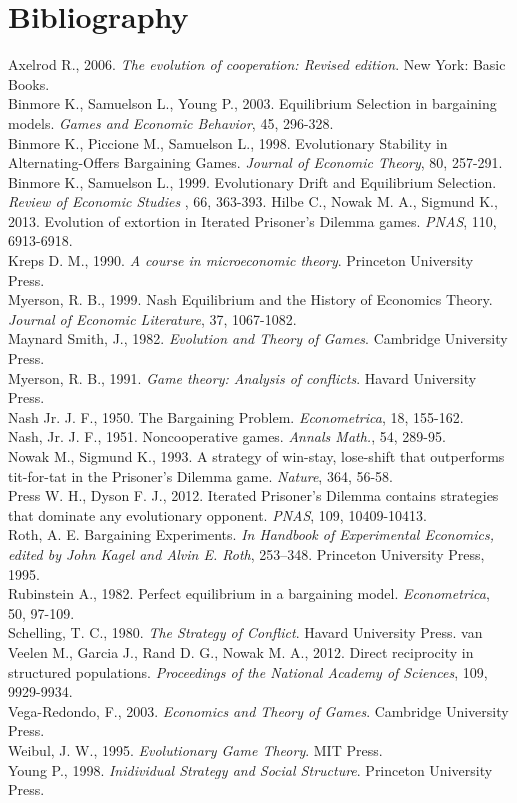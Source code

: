 \documentclass[12.5pt]{report}
\begin{document}
\chapter*{Bibliography}
Axelrod R., 2006. {\emph{The evolution of cooperation: Revised edition}}. New York: Basic Books.\\ 
Binmore K., Samuelson L., Young P., 2003. Equilibrium Selection in bargaining models. {\emph{Games and Economic Behavior}}, 45, 296-328.\\ 
Binmore K., Piccione M., Samuelson L., 1998. Evolutionary Stability in Alternating-Offers Bargaining Games. {\emph{Journal of Economic Theory}}, 80, 257-291.  \\
Binmore K., Samuelson L., 1999. Evolutionary Drift and Equilibrium Selection. {\emph{Review of Economic Studies }}, 66, 363-393.
Hilbe C., Nowak M. A., Sigmund K., 2013. Evolution of extortion in Iterated Prisoner's Dilemma games. {\emph{PNAS}}, 110, 6913-6918. \\
Kreps D. M., 1990. {\emph{A course in microeconomic theory}}. Princeton University Press. \\
Myerson, R. B., 1999. Nash Equilibrium and the History of Economics Theory. {\emph{Journal of Economic Literature}}, 37, 1067-1082. \\
Maynard Smith, J., 1982. {\emph{Evolution and Theory of Games}}. Cambridge University Press. \\
Myerson, R. B., 1991. {\emph{Game theory: Analysis of conflicts}}. Havard University Press. \\
Nash Jr. J. F., 1950. The Bargaining Problem. {\emph{Econometrica}}, 18, 155-162. \\
Nash, Jr. J. F., 1951. Noncooperative games. {\emph{Annals Math.}}, 54, 289-95. \\
Nowak M., Sigmund K., 1993. A strategy of win-stay, lose-shift that outperforms tit-for-tat in the Prisoner's Dilemma game. {\emph{Nature}}, 364, 56-58. \\
Press W. H., Dyson F. J., 2012. Iterated Prisoner's Dilemma contains strategies that dominate any evolutionary opponent. {\emph{PNAS}}, 109, 10409-10413. \\
 Roth, A. E. Bargaining Experiments. {\emph{In Handbook of Experimental Economics, edited by John Kagel and Alvin E. Roth}}, 253–348. Princeton University Press, 1995.\\
Rubinstein A., 1982. Perfect equilibrium in a bargaining model. {\emph{Econometrica}}, 50, 97-109. \\
Schelling, T. C., 1980. {\emph{The Strategy of Conflict}}. Havard University Press. 
van Veelen M., Garcia J., Rand D. G., Nowak M. A., 2012. Direct reciprocity in structured populations. {\emph{Proceedings of the National Academy of Sciences}}, 109, 9929-9934. \\
Vega-Redondo, F., 2003. {\emph{Economics and Theory of Games}}. Cambridge University Press. \\
Weibul, J. W., 1995. {\emph{Evolutionary Game Theory}}. MIT Press. \\
Young P., 1998. {\emph{Inidividual Strategy and Social Structure}}. Princeton University Press.\\ 
\end{document}
